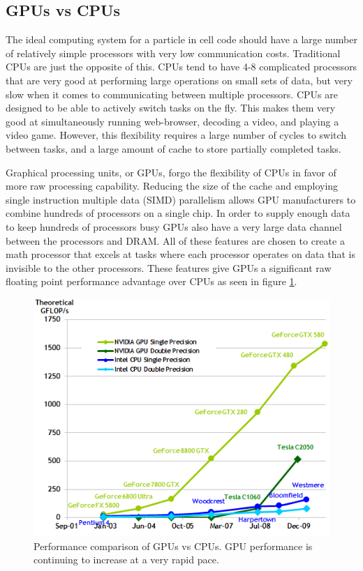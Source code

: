 		\subsection{GPUs vs CPUs}
	The ideal computing system for a particle in cell code should have a large number of relatively simple processors with very low communication costs. Traditional CPUs are just the opposite of this. CPUs tend to have 4-8 complicated processors that are very good at performing large operations on small sets of data, but very slow when it comes to communicating between multiple processors. CPUs are designed to be able to actively switch tasks on the fly. This makes them very good at simultaneously running web-browser, decoding a video, and playing a video game. However, this flexibility requires a large number of cycles to switch between tasks, and a large amount of cache to store partially completed tasks.

Graphical processing units, or GPUs, forgo the flexibility of CPUs in favor of more raw processing capability. Reducing the size of the cache and employing single instruction multiple data (SIMD) parallelism allows GPU manufacturers to combine hundreds of processors on a single chip. In order to supply enough data to keep hundreds of processors busy GPUs also have a very large data channel between the processors and DRAM. All of these features are chosen to create a math processor that excels at tasks where each processor operates on data that is invisible to the other processors. These features give GPUs a significant raw floating point performance advantage over CPUs as seen in figure \ref{fig:gpu_vs_cpu}. 


\begin{figure}
\begin{center}
\includegraphics[width=5in]{introduction/gpu_vs_cpu.png}
\end{center}
\caption[Performance comparison of GPUs vs CPUs.]{Performance comparison of GPUs vs CPUs. GPU performance is continuing to increase at a very rapid pace.\cite{NVIDIACorporation2011}}
\label{fig:gpu_vs_cpu}
\end{figure}

